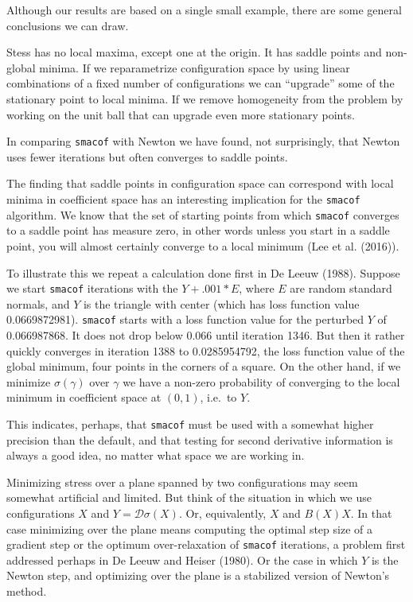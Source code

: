 \documentclass[12pt,]{article}
\begin{document}
Although our results are based on a single small example, there are some
general conclusions we can draw.

Stess has no local maxima, except one at the origin. It has saddle
points and non-global minima. If we reparametrize configuration space by
using linear combinations of a fixed number of configurations we can
``upgrade'' some of the stationary point to local minima. If we remove
homogeneity from the problem by working on the unit ball that can
upgrade even more stationary points.

In comparing \texttt{smacof} with Newton we have found, not
surprisingly, that Newton uses fewer iterations but often converges to
saddle points.

The finding that saddle points in configuration space can correspond
with local minima in coefficient space has an interesting implication
for the \texttt{smacof} algorithm. We know that the set of starting
points from which \texttt{smacof} converges to a saddle point has
measure zero, in other words unless you start in a saddle point, you
will almost certainly converge to a local minimum (Lee et al. (2016)).

To illustrate this we repeat a calculation done first in De Leeuw
(1988). Suppose we start \texttt{smacof} iterations with the
\(Y+.001*E\), where \(E\) are random standard normals, and \(Y\) is the
triangle with center (which has loss function value 0.0669872981).
\texttt{smacof} starts with a loss function value for the perturbed
\(Y\) of 0.066987868. It does not drop below 0.066 until iteration 1346.
But then it rather quickly converges in iteration 1388 to 0.0285954792,
the loss function value of the global minimum, four points in the
corners of a square. On the other hand, if we minimize
\(\sigma(\gamma)\) over \(\gamma\) we have a non-zero probability of
converging to the local minimum in coefficient space at \((0,1)\),
i.e.~to \(Y\).

This indicates, perhaps, that \texttt{smacof} must be used with a
somewhat higher precision than the default, and that testing for second
derivative information is always a good idea, no matter what space we
are working in.

Minimizing stress over a plane spanned by two configurations may seem
somewhat artificial and limited. But think of the situation in which we
use configurations \(X\) and \(Y=\mathcal{D}\sigma(X)\). Or,
equivalently, \(X\) and \(B(X)X\). In that case minimizing over the
plane means computing the optimal step size of a gradient step or the
optimum over-relaxation of \texttt{smacof} iterations, a problem first
addressed perhaps in De Leeuw and Heiser (1980). Or the case in which
\(Y\) is the Newton step, and optimizing over the plane is a stabilized
version of Newton's method.
\end{document}
